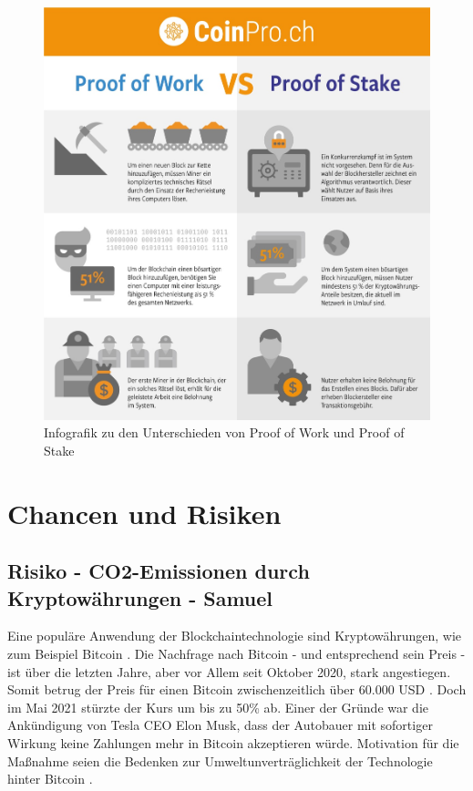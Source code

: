 \begin{figure}[ht!]
	\centering
	\includegraphics[width=160mm]{ProofOfWorkVSProfOfStake.jpg}
	\caption{Infografik zu den Unterschieden von Proof of Work und Proof of Stake} \label{overflow}
\end{figure}

\chapter{Chancen und Risiken}
\section{Risiko - CO2-Emissionen durch Kryptowährungen - Samuel}
Eine populäre Anwendung der Blockchaintechnologie sind Kryptowährungen, wie zum Beispiel Bitcoin \cite{schinckus_good_2020}. Die Nachfrage nach Bitcoin - und entsprechend sein Preis - ist über die letzten Jahre, aber vor Allem seit Oktober 2020, stark angestiegen. Somit betrug der Preis für einen Bitcoin zwischenzeitlich über 60.000 USD \cite{noauthor_coindesk_2021}. Doch im Mai 2021 stürzte der Kurs um bis zu 50\% ab. Einer der Gründe war die Ankündigung von Tesla CEO Elon Musk, dass der Autobauer mit sofortiger Wirkung keine Zahlungen mehr in Bitcoin akzeptieren würde. Motivation für die Maßnahme seien die Bedenken zur Umweltunverträglichkeit der Technologie hinter Bitcoin \cite{waters_musk_2021}. 

